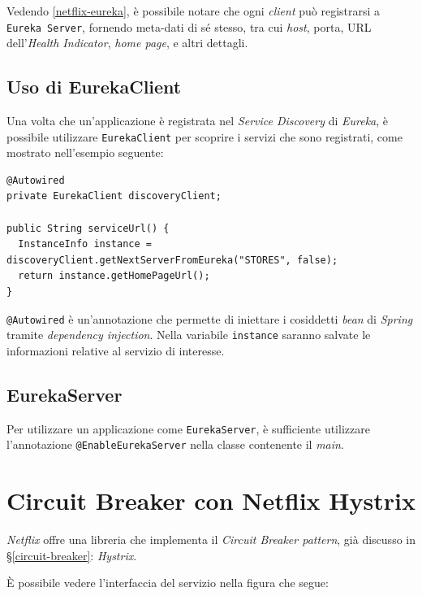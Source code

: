 Vedendo \ref{netflix-eureka}, è possibile notare che ogni \textit{client} può registrarsi a \texttt{Eureka Server}, fornendo meta-dati di sé stesso, tra cui \textit{host}, porta, URL dell'\textit{Health Indicator}, \textit{home page}, e altri dettagli.

\subsection{Uso di EurekaClient} Una volta che un'applicazione è registrata nel \textit{Service Discovery} di \textit{Eureka}, è possibile utilizzare \texttt{EurekaClient} per scoprire i servizi che sono registrati, come mostrato nell'esempio seguente:

 \begin{tcolorbox}
 	\begin{lstlisting}
@Autowired
private EurekaClient discoveryClient;

public String serviceUrl() {
  InstanceInfo instance = discoveryClient.getNextServerFromEureka("STORES", false);
  return instance.getHomePageUrl();
}
 	\end{lstlisting}
 \end{tcolorbox}

\texttt{@Autowired} è un'annotazione che permette di iniettare i cosiddetti \textit{bean} di \textit{Spring} tramite \textit{dependency injection}. Nella variabile \texttt{instance} saranno salvate le informazioni relative al servizio di interesse.

\subsection{EurekaServer} Per utilizzare un applicazione come \texttt{EurekaServer}, è sufficiente utilizzare l'annotazione \texttt{@EnableEurekaServer} nella classe contenente il \textit{main}.


\section{Circuit Breaker con Netflix Hystrix}

\textit{Netflix} offre una libreria che implementa il \textit{Circuit Breaker pattern}, già discusso in \S\ref{circuit-breaker}: \textit{Hystrix}.

È possibile vedere l'interfaccia del servizio nella figura che segue:

